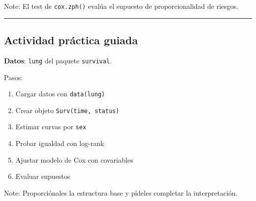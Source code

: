 \documentclass[
]{article}
\providecommand{\tightlist}{%
  \setlength{\itemsep}{0pt}\setlength{\parskip}{0pt}}
\begin{document}
Note: El test de \texttt{cox.zph()} evalúa el supuesto de
proporcionalidad de riesgos.

\begin{center}\rule{0.5\linewidth}{0.5pt}\end{center}

\subsection{Actividad práctica
guiada}\label{actividad-pruxe1ctica-guiada}

\textbf{Datos}: \texttt{lung} del paquete \texttt{survival}.

Pasos:

\begin{enumerate}
\def\labelenumi{\arabic{enumi}.}
\tightlist
\item
  Cargar datos con \texttt{data(lung)}
\item
  Crear objeto \texttt{Surv(time,\ status)}
\item
  Estimar curvas por \texttt{sex}
\item
  Probar igualdad con log-rank
\item
  Ajustar modelo de Cox con covariables
\item
  Evaluar supuestos
\end{enumerate}

Note: Proporciónales la estructura base y pídeles completar la
interpretación.
\end{document}
